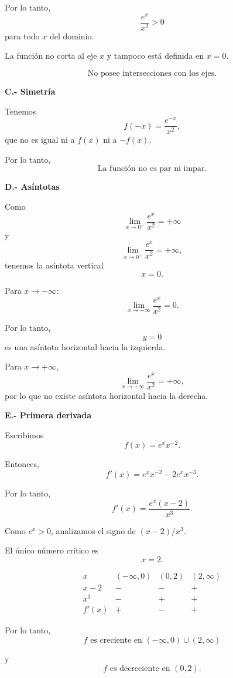 \documentclass[12pt]{article}
\begin{document}
\begin{enumerate}[label=\alph*.-]
    Por lo tanto,
    \[
    \frac{e^x}{x^2}>0
    \]
    para todo $x$ del dominio.

    La función no corta al eje $x$ y tampoco está definida en $x=0$.

    \[
    \boxed{\text{No posee intersecciones con los ejes.}}
    \]

    \textbf{C.- Simetría}

    Tenemos
    \[
    f(-x)=\frac{e^{-x}}{x^2},
    \]
    que no es igual ni a $f(x)$ ni a $-f(x)$.

    Por lo tanto,
    \[
    \boxed{\text{La función no es par ni impar.}}
    \]

    \textbf{D.- Asíntotas}

    Como
    \[
    \lim_{x\to0^-}\frac{e^x}{x^2}=+\infty
    \]
    y
    \[
    \lim_{x\to0^+}\frac{e^x}{x^2}=+\infty,
    \]
    tenemos la asíntota vertical
    \[
    \boxed{x=0}.
    \]

    Para $x\to-\infty$:
    \[
    \lim_{x\to-\infty}\frac{e^x}{x^2}=0.
    \]

    Por lo tanto,
    \[
    \boxed{y=0}
    \]
    es una asíntota horizontal hacia la izquierda.

    Para $x\to+\infty$,
    \[
    \lim_{x\to+\infty}\frac{e^x}{x^2}=+\infty,
    \]
    por lo que no existe asíntota horizontal hacia la derecha.

    \textbf{E.- Primera derivada}

    Escribimos
    \[
    f(x)=e^x x^{-2}.
    \]

    Entonces,
    \[
    f'(x)
    =
    e^x x^{-2}-2e^x x^{-3}.
    \]

    Por lo tanto,
    \[
    f'(x)
    =
    \frac{e^x(x-2)}{x^3}.
    \]

    Como $e^x>0$, analizamos el signo de
    $(x-2)/x^3$.

    El único número crítico es
    \[
    x=2.
    \]

    \[
    \begin{array}{c|ccc}
    x & (-\infty,0) & (0,2) & (2,\infty)\\
    \hline
    x-2 & - & - & +\\
    x^3 & - & + & +\\
    \hline
    f'(x) & + & - & +
    \end{array}
    \]

    Por lo tanto,
    \[
    \boxed{
    f\text{ es creciente en }(-\infty,0)\cup(2,\infty)
    }
    \]

    y
    \[
    \boxed{
    f\text{ es decreciente en }(0,2).
    }
    \]


\end{enumerate}
\end{document}
